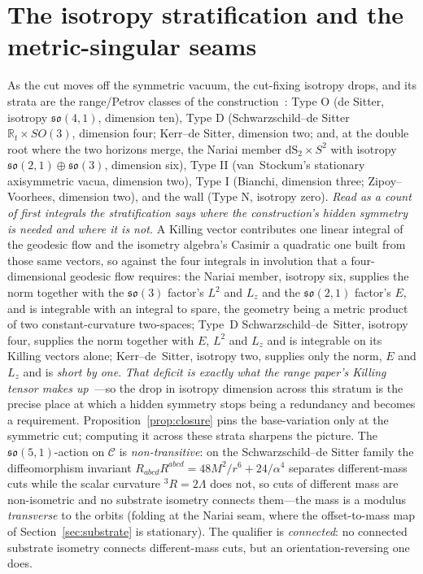 \documentclass[11pt,a4paper]{article}
\theoremstyle{plain}
\theoremstyle{definition}
\theoremstyle{remark}
\newcommand{\so}{\mathfrak{so}}
\newcommand{\C}{\mathcal{C}}
\newcommand{\dS}{\mathrm{dS}}
\begin{document}
\section{The isotropy stratification and the metric-singular seams}\label{sec:strata}

As the cut moves off the symmetric vacuum, the cut-fixing isotropy drops, and its strata are the range/Petrov classes of the construction~\cite{JanzenRange}: Type O (de Sitter, isotropy $\so(4,1)$, dimension ten), Type D (Schwarzschild--de Sitter $\mathbb{R}_t\times SO(3)$, dimension four; Kerr--de Sitter, dimension two; and, at the double root where the two horizons merge, the Nariai member $\dS_2\times S^2$ with isotropy $\so(2,1)\oplus\so(3)$, dimension six), Type II (van~Stockum's stationary axisymmetric vacua, dimension two), Type I (Bianchi, dimension three; Zipoy--Voorhees, dimension two), and the wall (Type N, isotropy zero). \emph{Read as a count of first integrals the stratification says where the construction's hidden symmetry is needed and where it is not.} A Killing vector contributes one linear integral of the geodesic flow and the isometry algebra's Casimir a quadratic one built from those same vectors, so against the four integrals in involution that a four-dimensional geodesic flow requires: the Nariai member, isotropy six, supplies the norm together with the $\so(3)$ factor's $L^{2}$ and $L_{z}$ and the $\so(2,1)$ factor's $E$, and is integrable with an integral to spare, the geometry being a metric product of two constant-curvature two-spaces; Type~D Schwarzschild--de~Sitter, isotropy four, supplies the norm together with $E$, $L^{2}$ and $L_{z}$ and is integrable on its Killing vectors alone; Kerr--de~Sitter, isotropy two, supplies only the norm, $E$ and $L_{z}$ and is \emph{short by one}. \emph{That deficit is exactly what the range paper's Killing tensor makes up}~\cite{JanzenRange}---so the drop in isotropy dimension across this stratum is the precise place at which a hidden symmetry stops being a redundancy and becomes a requirement. Proposition~\ref{prop:closure} pins the base-variation only at the symmetric cut; computing it across these strata sharpens the picture. The $\so(5,1)$-action on $\C$ is \emph{non-transitive}: on the Schwarzschild--de Sitter family the diffeomorphism invariant $R_{abcd}R^{abcd}=48M^2/r^6+24/\alpha^4$ separates different-mass cuts while the scalar curvature ${}^3R=2\Lambda$ does not, so cuts of different mass are non-isometric and no substrate isometry connects them---the mass is a modulus \emph{transverse} to the orbits (folding at the Nariai seam, where the offset-to-mass map of Section~\ref{sec:substrate} is stationary). The qualifier is \emph{connected}: no connected substrate isometry connects different-mass cuts, but an orientation-reversing one does. 
\end{document}
